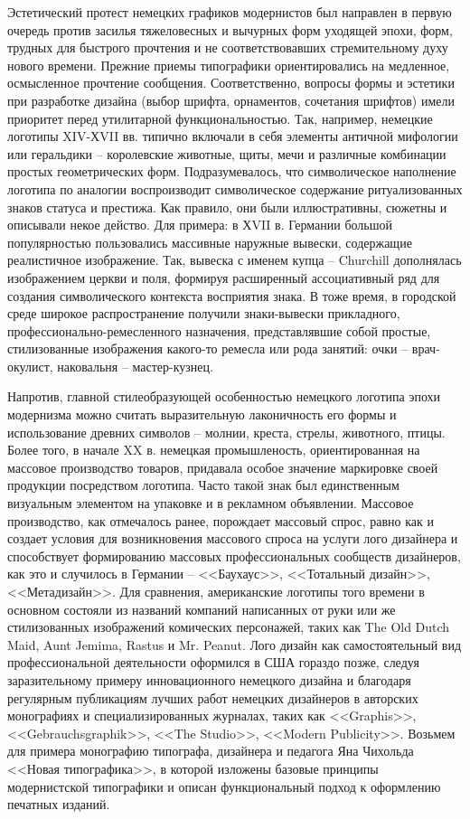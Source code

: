Эстетический протест немецких графиков модернистов был направлен в первую очередь против засилья
тяжеловесных и вычурных форм уходящей эпохи, форм, трудных для быстрого прочтения и не
соответствовавших стремительному духу нового времени. Прежние приемы типографики ориентировались на
медленное, осмысленное прочтение сообщения. Соответственно, вопросы формы и эстетики при разработке
дизайна (выбор шрифта, орнаментов, сочетания шрифтов) имели приоритет перед утилитарной
функциональностью. Так, например, немецкие логотипы XIV-ХVII вв. типично включали в себя элементы
античной мифологии или геральдики -- королевские животные, щиты, мечи и различные комбинации простых
геометрических форм. Подразумевалось, что символическое наполнение логотипа по аналогии
воспроизводит символическое содержание ритуализованных знаков статуса и престижа. Как правило, они
были иллюстративны, сюжетны и описывали некое действо. Для примера: в ХVII в. Германии большой
популярностью пользовались массивные наружные вывески, содержащие реалистичное изображение. Так,
вывеска с именем купца -- Churchill дополнялась изображением церкви и поля, формируя расширенный
ассоциативный ряд для создания символического контекста восприятия знака. В тоже время, в городской
среде широкое распространение получили знаки-вывески прикладного, профессионально-ремесленного
назначения, представлявшие собой простые, стилизованные изображения какого-то ремесла или рода
занятий: очки -- врач-окулист, наковальня -- мастер-кузнец.

Напротив, главной стилеобразующей особенностью немецкого логотипа эпохи модернизма можно считать
выразительную лаконичность его формы и использование древних символов – молнии, креста, стрелы,
животного, птицы. Более того, в начале XX в. немецкая промышленость, ориентированная на массовое
производство товаров, придавала особое значение маркировке своей продукции посредством
логотипа. Часто такой знак был единственным визуальным элементом на упаковке и в рекламном
объявлении. Массовое производство, как отмечалось ранее, порождает массовый спрос, равно как и
создает условия для возникновения массового спроса на услуги лого дизайнера и способствует
формированию массовых профессиональных сообществ дизайнеров, как это и случилось в Германии --
<<Баухаус>>, <<Тотальный дизайн>>, <<Метадизайн>>. Для сравнения, американские логотипы того времени в
основном состояли из названий компаний написанных от руки или же стилизованных изображений
комических персонажей, таких как The Old Dutch Maid, Aunt Jemima, Rastus и
Mr. Peanut. \autocite{link:mpr} Лого дизайн как самостоятельный вид профессиональной деятельности
оформился в США гораздо позже, следуя заразительному примеру инновационного немецкого дизайна и
благодаря регулярным публикациям лучших работ немецких дизайнеров в авторских монографиях и
специализированных журналах, таких как <<Graphis>>, <<Gebrauchsgraphik>>, <<The Studio>>, <<Modern
Publicity>>. Возьмем для примера монографию типографа, дизайнера и педагога Яна Чихольда <<Новая
типографика>>\autocite{chihold2011}, в которой изложены базовые принципы модернистской типографики и
описан функциональный подход к оформлению печатных изданий.

